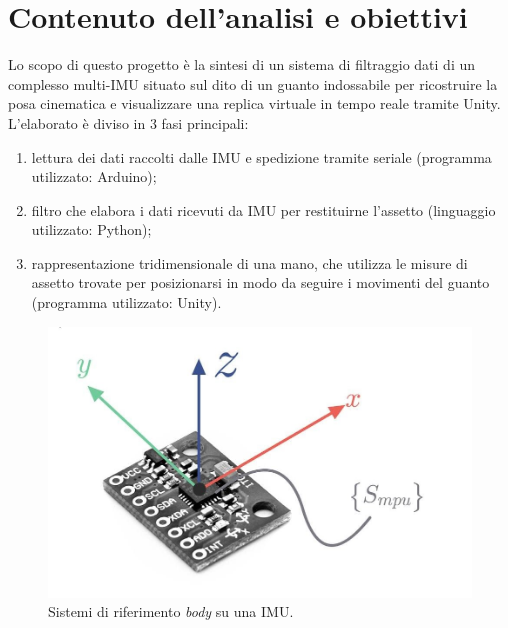 

\section{Contenuto dell'analisi e obiettivi}

Lo scopo di questo progetto è la sintesi di un sistema di filtraggio dati di un complesso multi-IMU situato sul dito di un guanto indossabile per ricostruire la posa cinematica \cite{8624929} e visualizzare una replica virtuale in tempo reale tramite Unity.\\

L'elaborato è diviso in 3 fasi principali:
\begin{enumerate}
    \item lettura dei dati raccolti dalle IMU e spedizione tramite seriale (programma utilizzato: Arduino);
    \item filtro che elabora i dati ricevuti da IMU per restituirne l'assetto (linguaggio utilizzato: Python);
    \item rappresentazione tridimensionale di una mano, che utilizza le misure di assetto trovate per posizionarsi in modo da seguire i movimenti del guanto (programma utilizzato: Unity).
\end{enumerate}


\begin{figure}[H]
    \includegraphics[scale=0.35]{immagini/IMU_sdr.jpg}
    \centering
    \caption{Sistemi di riferimento \textit{body} su una IMU.}
\end{figure}

\clearpage